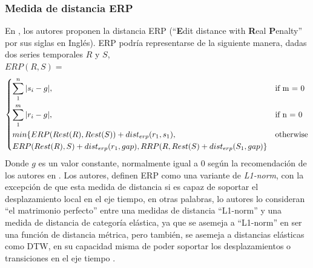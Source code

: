 \subsubsection{\textbf{Medida de distancia ERP}}
En \cite{erp}, los autores proponen la distancia ERP (\enquote{\textbf{E}dit distance with \textbf{R}eal \textbf{P}enalty} por sus siglas en Ingl\'es). ERP podr\'ia representarse de la siguiente manera, dadas dos series temporales $R$ y $S$,\\
$ERP(R, S) =$
\[
\begin{dcases}
    \sum\limits_{1}^{n}|s_i - g|,&   \text{if m = 0}\\
    \sum\limits_{1}^{m}|r_i - g|,&   \text{if n = 0}\\       
    {min\{ERP(Rest(R), Rest(S)) + dist_{erp}(r_1,s_1)}, & \text{otherwise}\\
    {ERP(Rest(R),S) + dist_{erp}(r_1,gap), RRP(R,Rest(S) + dist_{erp}(S_1,gap)}\} 
\end{dcases}
\]
Donde $g$ es un valor constante, normalmente igual a 0 seg\'un la recomendaci\'on de los autores en \cite{erp}. Los autores, definen ERP como una variante de \textit{L1-norm}, con la excepci\'on de que esta medida de distancia si es capaz de soportar el desplazamiento local en el eje tiempo, en otras palabras, lo autores lo consideran \enquote{el matrimonio perfecto} entre una medidas de distancia \enquote{L1-norm} y una medida de distancia de categor\'ia el\'astica, ya que se asemeja a \enquote{L1-norm} en ser una funci\'on de distancia m\'etrica, pero tambi\'en, se asemeja a distancias el\'asticas como DTW, en su capacidad misma de poder soportar los desplazamientos o transiciones en el eje tiempo \cite{erp}.
